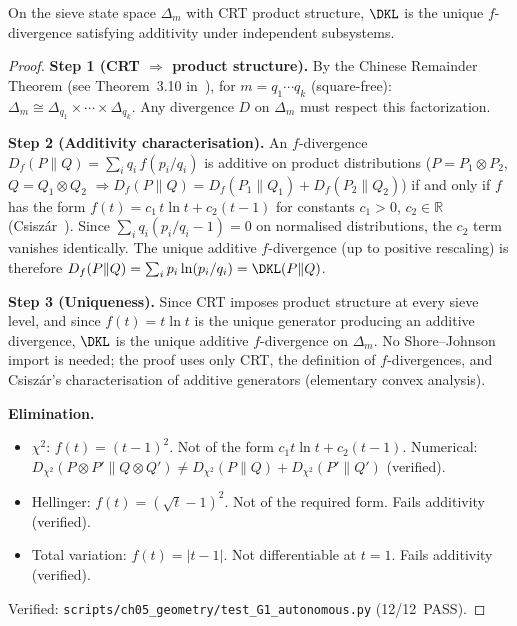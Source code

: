 \documentclass[12pt,a4paper]{article}
\begin{document}
\begin{theorem}
\label{thm:G1_autonomous}
On the sieve state space $\Delta_m$ with CRT product structure, $\DKL$
is the unique $f$-divergence satisfying additivity under independent subsystems.

\begin{proof}
\textbf{Step 1 (CRT $\Rightarrow$ product structure).}
By the Chinese Remainder Theorem (see Theorem~3.10 in~\cite{companion_M1}), for
$m = q_1 \cdots q_k$ (square-free):
$\Delta_m \cong \Delta_{q_1} \times \cdots \times \Delta_{q_k}$.
Any divergence $D$ on $\Delta_m$ must respect this factorization.

\textbf{Step 2 (Additivity characterisation).}
An $f$-divergence $D_f(P\|Q) = \sum_i q_i\,f(p_i/q_i)$ is additive on
product distributions ($P = P_1 \otimes P_2$, $Q = Q_1 \otimes Q_2$
$\Rightarrow D_f(P\|Q) = D_f(P_1\|Q_1) + D_f(P_2\|Q_2)$) if and only
if $f$ has the form $f(t) = c_1\,t\ln t + c_2(t-1)$ for constants $c_1 > 0$,
$c_2 \in \mathbb{R}$ (Csisz\'ar~\cite{Csiszar1967}).
Since $\sum_i q_i(p_i/q_i - 1) = 0$ on normalised distributions,
the $c_2$ term vanishes identically. The unique additive $f$-divergence
(up to positive rescaling) is therefore
$D_f(P\|Q) = \sum_i p_i \ln(p_i/q_i) = \DKL(P\|Q)$.

\textbf{Step 3 (Uniqueness).}
Since CRT imposes product structure at every sieve level, and since
$f(t) = t\ln t$ is the unique generator producing an additive divergence,
$\DKL$ is the unique additive $f$-divergence on $\Delta_m$.
No Shore--Johnson import is needed; the proof uses only CRT, the
definition of $f$-divergences, and Csisz\'ar's characterisation
of additive generators (elementary convex analysis).

\textbf{Elimination.}
\begin{itemize}[nosep]
\item $\chi^2$: $f(t) = (t-1)^2$. Not of the form $c_1 t\ln t + c_2(t-1)$.
  Numerical: $D_{\chi^2}(P\otimes P' \| Q\otimes Q') \neq D_{\chi^2}(P\|Q) + D_{\chi^2}(P'\|Q')$ (verified).
\item Hellinger: $f(t) = (\sqrt{t}-1)^2$. Not of the required form. Fails additivity (verified).
\item Total variation: $f(t) = |t-1|$. Not differentiable at $t=1$. Fails additivity (verified).
\end{itemize}

\noindent
Verified: \texttt{scripts/ch05\_geometry/test\_G1\_autonomous.py} (12/12~PASS).
\end{proof}
\end{theorem}
\end{document}
